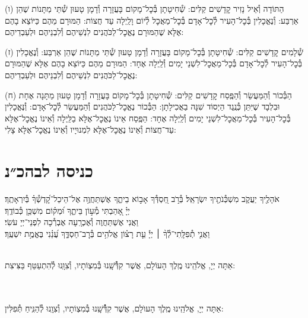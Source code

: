 \documentclass[twoside, openany, parskip=half, 11pt]{book}
\begin{document}
(ו) הַתּוֹדָה וְ֯אֵיל נָזִיר קׇדָשִׁים קַלִּים: שְׁ֯חִיטָתָן בְּ֯כׇל־מָקוֹם בָּעֲזָרָה וְ֯דָמָן טָעוּן שְׁ֯תֵּי מַתָּנוֹת שֶׁהֵן אַרְבַּע: וְ֯נֶאֱכָלִין בְּ֯כׇל־הָעִיר לְ֯כׇל־אָדָם בְּ֯כׇל־מַאֲכׇל לְ֯יוֹם וָלַֽיְלָה עַד חֲצוֹת: הַמּוּרָם מֵהֶם כַּיּוֹצֵא בָהֶם אֶלָּא שֶׁהַמּוּרָם נֶאֱכׇל־לַכֹּהֲנִים לִנְשֵׁיהֶם וְ֯לִבְנֵיהֶם וּלְעַבְדֵיהֶם:

(ז) שְׁ֯לָמִים קׇדָשִׁים קַלִּים: שְׁ֯חִיטָתָן בְּ֯כׇל־מָקוֹם בָּעֲזָרָה וְ֯דָמָן טָעוּן שְׁ֯תֵּי מַתָּנוֹת שֶׁהֵן אַרְבַּע: וְ֯נֶאֱכָלִין בְּ֯כׇל־הָעִיר לְ֯כׇל־אָדָם בְּ֯כׇל־מַאֲכׇל־לִשְׁנֵי יָמִים וְ֯לַֽיְלָה אֶחָד: הַמּוּרָם מֵהֶם כַּיּוֹצֵא בָהֶם אֶלָּא שֶׁהַמּוּרָם נֶאֱכׇל־לַכֹּהֲנִים לִנְשֵׁיהֶם וְ֯לִבְנֵיהֶם וּלְעַבְדֵיהֶם:

(ח) הַבְּ֯כוֹר וְ֯הַמַּעֲשֵׂר וְ֯הַפֶּֽסַח קׇדָשִׁים קַלִּים: שְׁ֯חִיטָתָן בְּ֯כׇל־מָקוֹם בָּעֲזָרָה וְ֯דָמָן טָעוּן מַתָּנָה אֶחָת וּבִלְבָד שֶׁיִּתֵּן כְּ֯נֶֽגֶד הַיְסוֹד שִׁנָּה בַאֲכִילָתָן: הַבְּ֯כוֹר נֶאֱכׇל־לַכֹּהֲנִים וְ֯הַמַּעֲשֵׂר לְ֯כׇל־אָדָם: וְ֯נֶּאֱכָלִין בְּ֯כׇל־הָעִיר בְּ֯כׇל־מַאֲכׇל־לִשְׁנֵי יָמִים וְ֯לַֽיְלָה אֶחָד: הַפֶּֽסַח אֵינוֹ נֶאֱכׇל־אֶלָּא בַלַּֽיְלָה וְ֯אֵינוֹ נֶאֱכׇל־אֶלָּא עַד־חֲצוֹת וְ֯אֵינוֹ נֶאֱכׇל־אֶלָּא לִמְנוּיָיו וְ֯אֵינוֹ נֶאֱכׇל־אֶלָּא צָלִי:\\


\section[כניסה לבהכ״נ]{ כניסה לבהכ״נ }
אֹהָלֶ֖יךָ יַעֲקֹ֑ב מִשְׁכְּ֯נֹתֶ֖יךָ יִשְׂרָאֵֽל׃
בְּ֯רֹ֣ב חַ֭סְדְּ֯ךָ אָב֣וֹא בֵיתֶ֑ךָ אֶשְׁתַּחֲוֶ֥ה אֶל־הֵיכַל־קׇ֝דְשְׁ֯ךָ֗ בְּ֯יִרְאָתֶֽךָ׃\\
יְיָ֗ אָ֭הַבְתִּי מְ֯ע֣וֹן בֵּיתֶ֑ךָ וּ֝מְק֗וֹם מִשְׁכַּ֥ן כְּ֯בוֹדֶֽךָ׃ \\
וַאֲנִי אֶשְׁתַּחֲוֶה וְ֯אֶכְרָֽעָה אֶבְרְ֯כָה לִפְנֵי־יְיָ עֹשִׂי׃\\
וַאֲנִ֤י
%
תְ֯פִלָּֽתִי־לְ֯ךָ֨ ׀ יְיָ֡ עֵ֤ת רָצ֗וֹן אֱלֹהִ֥ים בְּ֯רׇב־חַסְדֶּ֑ךָ עֲ֝נֵ֗נִי בֶּאֱמֶ֥ת יִשְׁעֶֽךָ׃

\\
אַתָּה יְיָ, אֱלֹהֵֽינוּ מֶֽלֶךְ הָעוֹלָם, אֲשֶׁר קִדְּ֯֯שָֽׁנוּ בְּ֯מִצְוֹתָיו, וְ֯צִוָּֽנוּ לְ֯הִתְעַטֵּף בַּצִּיצִת:


\\
\\
אַתָּה יְיָ, אֱלֹהֵֽינוּ מֶֽלֶךְ הָעוֺלָם, אֲשֶׁר קִדְּ֯֯שָֽׁנוּ בְּ֯מִצְוֹתָיו, וְ֯צִוָֽנוּ לְ֯הַנִּֽיחַ תְּ֯פִלִּין:
\end{document}
